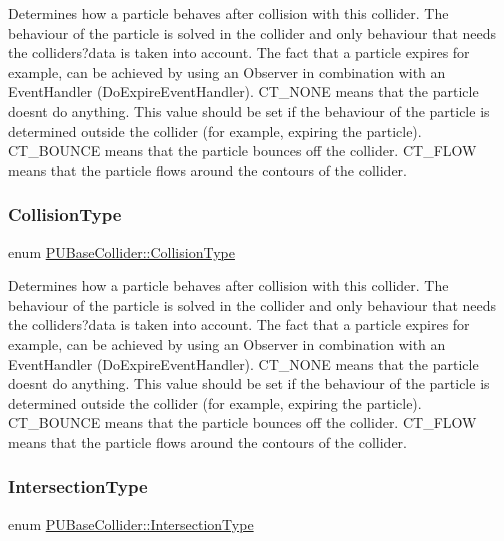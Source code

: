 Determines how a particle behaves after collision with this collider. The behaviour of the particle is solved in the collider and only behaviour that needs the colliders?data is taken into account. The fact that a particle expires for example, can be achieved by using an Observer in combination with an Event\+Handler (Do\+Expire\+Event\+Handler). C\+T\+\_\+\+N\+O\+NE means that the particle doesn\textquotesingle{}t do anything. This value should be set if the behaviour of the particle is determined outside the collider (for example, expiring the particle). C\+T\+\_\+\+B\+O\+U\+N\+CE means that the particle bounces off the collider. C\+T\+\_\+\+F\+L\+OW means that the particle flows around the contours of the collider. \mbox{\label{classPUBaseCollider_a13f646d7a12d1abb3cca3043c817e726}} 
\subsubsection{\texorpdfstring{Collision\+Type}{CollisionType}\hspace{0.1cm}{\footnotesize\ttfamily [2/2]}}
{\footnotesize\ttfamily enum \hyperlink{classPUBaseCollider_a13f646d7a12d1abb3cca3043c817e726}{P\+U\+Base\+Collider\+::\+Collision\+Type}}

Determines how a particle behaves after collision with this collider. The behaviour of the particle is solved in the collider and only behaviour that needs the colliders?data is taken into account. The fact that a particle expires for example, can be achieved by using an Observer in combination with an Event\+Handler (Do\+Expire\+Event\+Handler). C\+T\+\_\+\+N\+O\+NE means that the particle doesn\textquotesingle{}t do anything. This value should be set if the behaviour of the particle is determined outside the collider (for example, expiring the particle). C\+T\+\_\+\+B\+O\+U\+N\+CE means that the particle bounces off the collider. C\+T\+\_\+\+F\+L\+OW means that the particle flows around the contours of the collider. \mbox{\label{classPUBaseCollider_ae86fc81f78c00a88e8e927377a86e81c}} 
\subsubsection{\texorpdfstring{Intersection\+Type}{IntersectionType}\hspace{0.1cm}{\footnotesize\ttfamily [1/2]}}
{\footnotesize\ttfamily enum \hyperlink{classPUBaseCollider_ae86fc81f78c00a88e8e927377a86e81c}{P\+U\+Base\+Collider\+::\+Intersection\+Type}}

